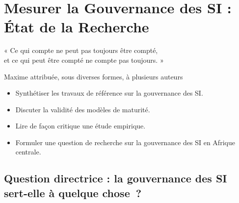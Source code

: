 
\chapter{Mesurer la Gouvernance des SI : État de la Recherche}
\label{chap:recherche-mesure}

\epigraph{%
    « Ce qui compte ne peut pas toujours être compté,\\
    et ce qui peut être compté ne compte pas toujours. »%
}{Maxime attribuée, sous diverses formes, à plusieurs auteurs}


\begin{boxobjectifs}
\begin{itemize}
    \item Synthétiser les travaux de référence sur la gouvernance des SI.
    \item Discuter la validité des modèles de maturité.
    \item Lire de façon critique une étude empirique.
    \item Formuler une question de recherche sur la gouvernance des SI en
          Afrique centrale.
\end{itemize}
\end{boxobjectifs}

\bigskip

\section*{Question directrice : la gouvernance des SI sert-elle à quelque chose~?}

